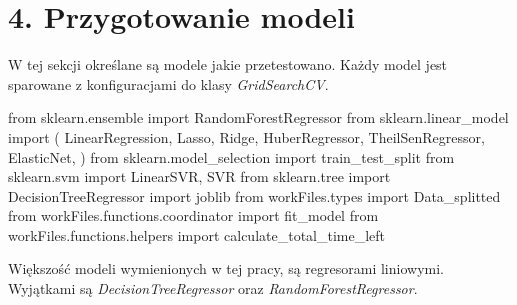 {}
\justify
\fontsize{14}{16}\selectfont
\setlength{\parindent}{0pt}
\section*{4. Przygotowanie modeli} 
\fontsize{12}{14}\selectfont

\hspace{1.5cm} W tej sekcji określane są modele jakie przetestowano. Każdy model jest sparowane z konfiguracjami do klasy \textit{GridSearchCV}.



\begin{pythoncode}
from sklearn.ensemble import RandomForestRegressor
from sklearn.linear_model import (
    LinearRegression,
    Lasso,
    Ridge,
    HuberRegressor,
    TheilSenRegressor,
    ElasticNet,
)
from sklearn.model_selection import train_test_split
from sklearn.svm import LinearSVR, SVR
from sklearn.tree import DecisionTreeRegressor
import joblib
from workFiles.types import Data_splitted
from workFiles.functions.coordinator import fit_model
from workFiles.functions.helpers import calculate_total_time_left
\end{pythoncode}




\hspace{1.5cm} Większość modeli wymienionych w tej pracy, są regresorami liniowymi. Wyjątkami są \textit{DecisionTreeRegressor} oraz \textit{RandomForestRegressor}.


